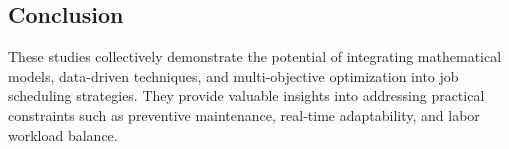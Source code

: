 \subsection{Conclusion}
These studies collectively demonstrate the potential of integrating mathematical models, data-driven techniques, and multi-objective optimization into job scheduling strategies. They provide valuable insights into addressing practical constraints such as preventive maintenance, real-time adaptability, and labor workload balance.
